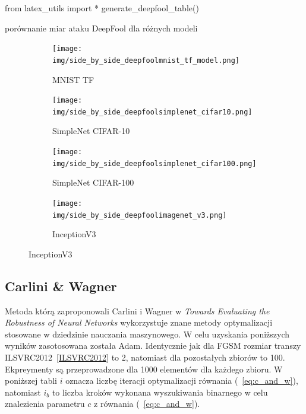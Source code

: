 \documentclass[
    left=2.5cm,         %
    right=2.5cm,        %
    top=2.5cm,          %
    bottom=3cm,         %
    bindingoffset=6mm,  %
    nohyphenation=false %
]{eiti/eiti-thesis}
\begin{document}
\begin{table}[h]
\begin{adjustbox}{max width=\textwidth}
\begin{pycode}
from latex_utils import *
generate_deepfool_table()
\end{pycode}
\end{adjustbox}
\caption{porównanie miar ataku DeepFool dla różnych modeli}
\end{table}

\begin{figure}[H]
    \caption{Przykłady wygenerowanych złośliwych za pomocą metody DeepFool}

    \begin{subfigure}[t]{0.48\textwidth}
        \texttt{[image: img/side\_by\_side\_deepfoolmnist\_tf\_model.png]}
        \caption{MNIST TF}
        \label{fig:mnist_side_deepfool}
    \end{subfigure}%
    \hfill
    \begin{subfigure}[t]{0.48\textwidth}
        \texttt{[image: img/side\_by\_side\_deepfoolsimplenet\_cifar10.png]}
        \caption{SimpleNet CIFAR-10}
        \label{fig:cifar10_side_deepfool}
    \end{subfigure}%

    \begin{subfigure}[t]{0.48\textwidth}
        \texttt{[image: img/side\_by\_side\_deepfoolsimplenet\_cifar100.png]}
        \caption{SimpleNet CIFAR-100}
        \label{fig:cifar100_side_deepfool}
    \end{subfigure}%
    \hfill
    \begin{subfigure}[t]{0.48\textwidth}
        \texttt{[image: img/side\_by\_side\_deepfoolimagenet\_v3.png]}
        \caption{InceptionV3}
        \label{fig:imagenet_side_deepfool}
    \end{subfigure}%

\end{figure}

\subsection{Carlini \& Wagner}
Metoda którą zaproponowali Carlini i Wagner w \textit{Towards Evaluating the Robustness of Neural Networks}\cite{DBLP:journals/corr/CarliniW16a}
wykorzystuje znane metody optymalizacji stosowane w dziedzinie nauczania maszynowego. W celu uzyskania poniższych wyników zasotosowana została
Adam\cite{DBLP:journals/corr/KingmaB14}. Identycznie jak dla FGSM rozmiar transzy ILSVRC2012~\ref{ILSVRC2012} to 2, natomiast dla pozostałych zbiorów to 100.
Ekpreymenty są przeprowadzone dla 1000 elementów dla każdego zbioru. W poniższej tabli $i$ oznacza liczbę iteracji optymalizacji równania (~\ref{eq:c_and_w}),
natomiast $i_b$ to liczba kroków wykonana wyszukiwania binarnego w celu znalezienia parametru $c$ z równania (~\ref{eq:c_and_w}).
\end{document}
